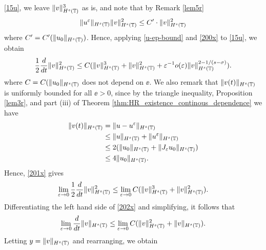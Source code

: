 \eqref{15u}, we leave $\|v\|_{H^s(\mathbb{T})}^3$ as is, and note that by Remark \ref{lem5r}
\begin{equation}
	\begin{split}
		\|u^\varepsilon\|_{H^s(\mathbb{T})} \|v\|_{H^s(\mathbb{T})}^2 \le C'
		\cdot \|v\|_{H^s(\mathbb{T})}^2
		\label{u-ep-bound}
	\end{split}
\end{equation}
where $C' = C'(\|u_0\|_{H^s(\mathbb{T})})$. Hence, applying \eqref{u-ep-bound} and \eqref{200x} to \eqref{15u}, we obtain
\begin{equation}
	\begin{split}
		\frac{1}{2} \frac{d}{dt} \|v\|_{H^s(\mathbb{T})}^2 \le C (
		\|v\|_{H^s(\mathbb{T})}^3 + \|v\|_{H^s(\mathbb{T})}^2 + \varepsilon ^{-1} o(\varepsilon) \|v\|_{H^s(\mathbb{T})}^{2-
		1/(s- \sigma)}).
		\label{201x}
	\end{split}
\end{equation}
where $C=C(\|u_0\|_{H^s(\mathbb{T})}$ does not depend on $\ee$. We also remark 
that $\|v(t)\|_{H^s(\mathbb{T})}$ is uniformly bounded for all $\ee > 0$, since by
the triangle inequality, Proposition \ref{lem3r}, and part (iii) of Theorem
\ref{thm:HR_existence_continous_dependence} we have
\begin{equation*}
	\begin{split}
		\|v(t) \|_{H^s(\mathbb{T})}
		& = \|u - u^\varepsilon \|_{H^s(\mathbb{T})}
		\\
		& \le \|u \|_{H^s(\mathbb{T})} + \|u^\varepsilon \|_{H^s(\mathbb{T})}
		\\
		& \le 2( \|u_0\|_{H^s(\mathbb{T})} + \|J_\varepsilon u_0\|_{H^s(\mathbb{T})})
		\\
		& \le 4 \|u_0\|_{H^s(\mathbb{T})}.
	\end{split}
\end{equation*}
Hence, \eqref{201x} gives
\begin{equation}
	\begin{split}
		\lim_{\varepsilon \to 0} \frac{1}{2} \frac{d}{dt} \|v\|_{H^s(\mathbb{T})}^2 \le
		 \lim_{\varepsilon \to 0} C (
		\|v\|_{H^s(\mathbb{T})}^3 + \|v\|_{H^s(\mathbb{T})}^2).
		\label{202x}
	\end{split}
\end{equation}
Differentiating the left hand side of
\eqref{202x} and simplifying, it follows that
\begin{equation*}
	\begin{split}
		\lim_{\varepsilon \to 0}\frac{d}{dt} \|v\|_{H^s(\mathbb{T})} \le
		\lim_{\varepsilon \to 0} C (\|v\|_{H^s(\mathbb{T})}^2 +
		\|v\|_{H^s(\mathbb{T})}).
	\end{split}
\end{equation*}
Letting $y = \|v\|_{H^s(\mathbb{T})}$ and rearranging, we obtain
